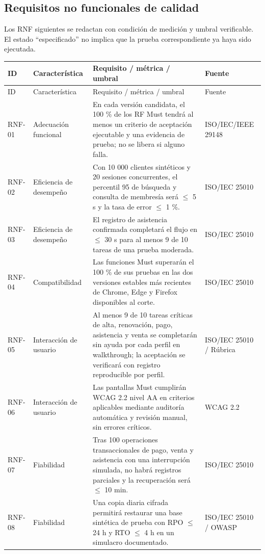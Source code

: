 \documentclass[11pt,a4paper,twoside]{article}
\begin{document}
\subsection{Requisitos no funcionales de calidad}
Los RNF siguientes se redactan con condición de medición y umbral verificable. El estado ``especificado'' no implica que la prueba correspondiente ya haya sido ejecutada.
\begin{landscape}
\scriptsize
\begin{longtable}{p{2.4cm}p{3.2cm}p{10.0cm}p{4.0cm}}
\toprule ID & Característica & Requisito / métrica / umbral & Fuente \\ \midrule\endfirsthead
\toprule ID & Característica & Requisito / métrica / umbral & Fuente \\ \midrule\endhead
RNF-01 & Adecuación funcional & En cada versión candidata, el 100 \% de los RF Must tendrá al menos un criterio de aceptación ejecutable y una evidencia de prueba; no se libera si alguno falla. & ISO/IEC/IEEE 29148 \\
RNF-02 & Eficiencia de desempeño & Con 10 000 clientes sintéticos y 20 sesiones concurrentes, el percentil 95 de búsqueda y consulta de membresía será $\leq$ 5 s y la tasa de error $\leq$ 1 \%. & ISO/IEC 25010 \\
RNF-03 & Eficiencia de desempeño & El registro de asistencia confirmada completará el flujo en $\leq$ 30 s para al menos 9 de 10 tareas de una prueba moderada. & ISO/IEC 25010 \\
RNF-04 & Compatibilidad & Las funciones Must superarán el 100 \% de sus pruebas en las dos versiones estables más recientes de Chrome, Edge y Firefox disponibles al corte. & ISO/IEC 25010 \\
RNF-05 & Interacción de usuario & Al menos 9 de 10 tareas críticas de alta, renovación, pago, asistencia y venta se completarán sin ayuda por cada perfil en walkthrough; la aceptación se verificará con registro reproducible por perfil. & ISO/IEC 25010 / Rúbrica \\
RNF-06 & Interacción de usuario & Las pantallas Must cumplirán WCAG 2.2 nivel AA en criterios aplicables mediante auditoría automática y revisión manual, sin errores críticos. & WCAG 2.2 \\
RNF-07 & Fiabilidad & Tras 100 operaciones transaccionales de pago, venta y asistencia con una interrupción simulada, no habrá registros parciales y la recuperación será $\leq$ 10 min. & ISO/IEC 25010 \\
RNF-08 & Fiabilidad & Una copia diaria cifrada permitirá restaurar una base sintética de prueba con RPO $\leq$ 24 h y RTO $\leq$ 4 h en un simulacro documentado. & ISO/IEC 25010 / OWASP \\

\end{longtable}
\end{landscape}
\end{document}
